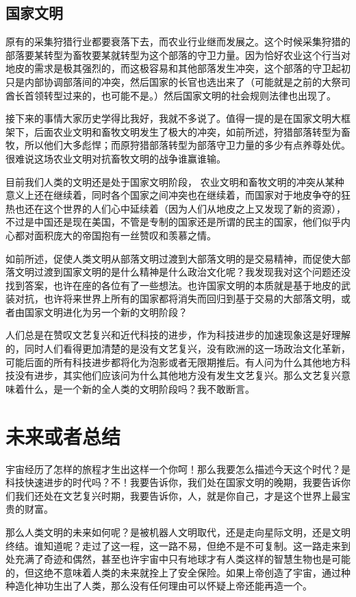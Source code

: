 \documentclass[12pt]{exam}%
\begin{document}
\subsection{国家文明}
原有的采集狩猎行业都要衰落下去，而农业行业继而发展之。这个时候采集狩猎的部落要某转型为畜牧要某就转型为这个部落的守卫力量。因为恰好农业这个行当对地皮的需求是极其强烈的，而这极容易和其他部落发生冲突，这个部落的守卫起初只是内部协调部落间的冲突，然后国家的长官也选出来了（可能就是之前的大祭司酋长首领转型过来的，也可能不是。）然后国家文明的社会规则法律也出现了。

接下来的事情大家历史学得比我好，我就不多说了。值得一提的是在国家文明大框架下，后面农业文明和畜牧文明发生了极大的冲突，如前所述，狩猎部落转型为畜牧，所以他们大多彪悍；而原狩猎部落转型为部落守卫力量的多少有点养尊处优。很难说这场农业文明对抗畜牧文明的战争谁赢谁输。

目前我们人类的文明还是处于国家文明阶段， 农业文明和畜牧文明的冲突从某种意义上还在继续着，同时各个国家之间冲突也在继续着，而国家对于地皮争夺的狂热也还在这个世界的人们心中延续着（因为人们从地皮之上又发现了新的资源），不过是中国还是现在美国，不管是专制的国家还是所谓的民主的国家，他们似乎内心都对面积庞大的帝国抱有一丝赞叹和羡慕之情。

如前所述，促使人类文明从部落文明过渡到大部落文明的是交易精神，而促使大部落文明过渡到国家文明的是什么精神是什么政治文化呢？我发现我对这个问题还没找到答案，也许在座的各位有了一些想法。也许国家文明的本质就是基于地皮的武装对抗，也许将来世界上所有的国家都将消失而回归到基于交易的大部落文明，或者由国家文明进化为另一个新的文明阶段？

人们总是在赞叹文艺复兴和近代科技的进步，作为科技进步的加速现象这是好理解的，同时人们看得更加清楚的是没有文艺复兴，没有欧洲的这一场政治文化革新，可能后面的所有科技进步都将化为泡影或者无限期推后。有人问为什么其他地方科技没有进步，其实他们应该问为什么其他地方没有发生文艺复兴。那么文艺复兴意味着什么，是一个新的全人类的文明阶段吗？我不敢断言。



\section{未来或者总结}
宇宙经历了怎样的旅程才生出这样一个你呵！那么我要怎么描述今天这个时代？是科技快速进步的时代吗？不！我要告诉你，我们处在国家文明的晚期，我要告诉你们我们还处在文艺复兴时期，我要告诉你，人，就是你自己，才是这个世界上最宝贵的财富。

那么人类文明的未来如何呢？是被机器人文明取代，还是走向星际文明，还是文明终结。谁知道呢？走过了这一程，这一路不易，但绝不是不可复制。这一路走来到处充满了奇迹和偶然，甚至也许宇宙中只有地球才有人类这样的智慧生物也是可能的，但这绝不意味着人类的未来就拴上了安全保险。如果上帝创造了宇宙，通过种种造化神功生出了人类，那么没有任何理由可以怀疑上帝还能再造一个。
\end{document}

